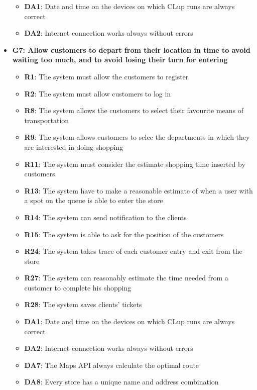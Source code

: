\documentclass{article}
\begin{document}
\begin{itemize}
\begin{itemize}
						\item {\bfseries DA1}: Date and time on the devices on which CLup runs are always correct
						\item {\bfseries DA2}: Internet connection works always without errors
							
					\end{itemize}

				 
				
				\item {\bfseries G7: Allow customers to depart from their location in time to avoid waiting too much, and to avoid losing their turn for entering}	

					\begin{itemize}
						\item {\bfseries R1}: The system must allow the customers to register
						\item {\bfseries R2}: The system must allow customers to log in
						\item {\bfseries R8}: The system allows the customers to select their favourite means of transportation
						\item {\bfseries R9}: The system allows customers to selec the departments in which they are interested in doing shopping
						\item {\bfseries R11}: The system must consider the estimate shopping time inserted by customers
						\item {\bfseries R13}: The system have to make a reasonable estimate of when a user with a spot on the queue is able to enter the store
						\item {\bfseries R14}: The system can send notification to the clients
						\item {\bfseries R15}: The system is able to ask for the position of the customers
						\item {\bfseries R24}: The system takes trace of each customer entry and exit from the store
						\item {\bfseries R27}: The system can reasonably estimate the time needed from a customer to complete his shopping
						\item {\bfseries R28}: The system saves clients' tickets \\
					
						\item {\bfseries DA1}: Date and time on the devices on which CLup runs are always correct
						\item {\bfseries DA2}: Internet connection works always without errors
						\item {\bfseries DA7}: The Maps API always calculate the optimal route 
						\item {\bfseries DA8}: Every store has a unique name and address combination
							

\end{itemize}
\end{itemize}
\end{document}

